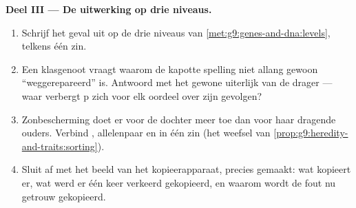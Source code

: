 \begin{problem}
\medskip\noindent\textbf{Deel III --- De uitwerking op drie
niveaus.}
\begin{enumerate}[resume]
  \item Schrijf het geval uit op de drie niveaus van
        \cref{met:g9:genes-and-dna:levels}, telkens één zin.
  \item Een klasgenoot vraagt waarom de kapotte spelling niet
        allang gewoon ``weggerepareerd'' is. Antwoord met het
        gewone uiterlijk van de drager --- waar verbergt p zich
        voor elk oordeel over zijn gevolgen?
  \item Zonbescherming doet er voor de dochter meer toe dan voor
        haar dragende ouders. Verbind , allelenpaar en
         in één zin (het weefsel van
        \cref{prop:g9:heredity-and-traits:sorting}).
  \item Sluit af met het beeld van het kopieerapparaat, precies
        gemaakt: wat kopieert er, wat werd er één keer verkeerd
        gekopieerd, en waarom wordt de fout nu getrouw
        gekopieerd.
\end{enumerate}
\end{problem}
